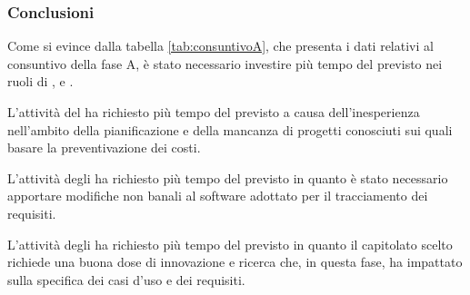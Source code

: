 \documentclass[../PianoProgetto.tex]{subfiles}
\begin{document}
		\subsubsection{Conclusioni}	
		Come si evince dalla tabella \ref{tab:consuntivoA}, che presenta i dati relativi al consuntivo della fase A, è stato necessario investire più tempo del previsto nei ruoli di \responsabilediprogetto{}, \amministratore{} e \analista.
		
		L'attività del \responsabilediprogetto{} ha richiesto più tempo del previsto a causa dell'inesperienza nell'ambito della pianificazione e della mancanza di progetti conosciuti sui quali basare la preventivazione dei costi.		
		
		L'attività degli \amministratori{} ha richiesto più tempo del previsto in quanto è stato necessario apportare modifiche non banali al software adottato per il tracciamento dei requisiti.
		
		L'attività degli \analisti{} ha richiesto più tempo del previsto in quanto il capitolato scelto richiede una buona dose di innovazione e ricerca che, in questa fase, ha impattato sulla specifica dei casi d'uso e dei requisiti.

	
\end{document}
